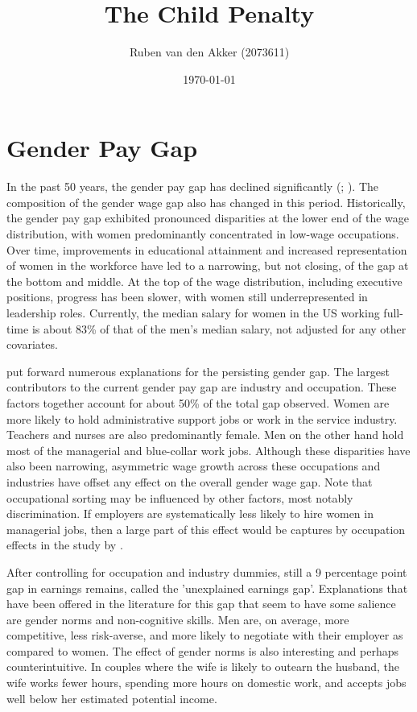 \documentclass[10pt]{article}
\begin{document}
\title{The Child Penalty}
\author{Ruben van den Akker (2073611)}
\date{\today}
\maketitle

 \section{Gender Pay Gap}
In the past 50 years, the gender pay gap has declined significantly (\cite{blau2017gender}; \cite{goldin2014grand}). The composition of the gender wage gap also has changed in this period. Historically, the gender pay gap exhibited pronounced disparities at the lower end of the wage distribution, with women predominantly concentrated in low-wage occupations. Over time, improvements in educational attainment and increased representation of women in the workforce have led to a narrowing, but not closing, of the gap at the bottom and middle. At the top of the wage distribution, including executive positions, progress has been slower, with women still underrepresented in leadership roles. Currently, the median salary for women in the US working full-time is about 83\% of that of the men's median salary, not adjusted for any other covariates.

\cite{blau2017gender} put forward numerous explanations for the persisting gender gap. The largest contributors to the current gender pay gap are industry and occupation. These factors together account for about 50\% of the total gap observed. Women are more likely to hold administrative support jobs or work in the service industry. Teachers and nurses are also predominantly female. Men on the other hand hold most of the managerial and blue-collar work jobs. Although these disparities have also been narrowing, asymmetric wage growth across these occupations and industries have offset any effect on the overall gender wage gap. Note that occupational sorting may be influenced by other factors, most notably discrimination. If employers are systematically less likely to hire women in managerial jobs, then a large part of this effect would be captures by occupation effects in the study by \cite{blau2017gender}.

After controlling for occupation and industry dummies, still a 9 percentage point gap in earnings remains, called the 'unexplained earnings gap'. Explanations that have been offered in the literature for this gap that seem to have some salience are gender norms and non-cognitive skills. Men are, on average, more competitive, less risk-averse, and more likely to negotiate with their employer as compared to women. The effect of gender norms is also interesting and perhaps counterintuitive. In couples where the wife is likely to outearn the husband, the wife works fewer hours, spending more hours on domestic work, and accepts jobs well below her estimated potential income.
\end{document}
